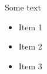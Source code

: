 \documentclass{article}
\begin{document}
    Some text
    \begin{itemize}[noitemsep]
        \item Item 1
        \item Item 2
        \item Item 3
    \end{itemize}
\end{document}
